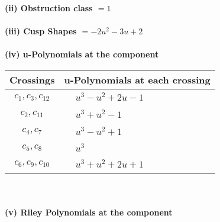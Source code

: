\documentclass[1p]{elsarticle_modified}
\theoremstyle{definition}
\begin{document}
\flushleft \textbf{(ii) Obstruction class $= 1$}\\~\\
\flushleft \textbf{(iii) Cusp Shapes $= -2 u^2-3 u+2$}\\~\\
\newpage\renewcommand{\arraystretch}{1}
\flushleft \textbf{(iv) u-Polynomials at the component}\newline \\
\begin{tabular}{m{50pt}|m{274pt}}
Crossings & \hspace{64pt}u-Polynomials at each crossing \\
\hline $$\begin{aligned}c_{1},c_{3},c_{12}\end{aligned}$$&$\begin{aligned}
&u^3- u^2+2 u-1
\end{aligned}$\\
\hline $$\begin{aligned}c_{2},c_{11}\end{aligned}$$&$\begin{aligned}
&u^3+u^2-1
\end{aligned}$\\
\hline $$\begin{aligned}c_{4},c_{7}\end{aligned}$$&$\begin{aligned}
&u^3- u^2+1
\end{aligned}$\\
\hline $$\begin{aligned}c_{5},c_{8}\end{aligned}$$&$\begin{aligned}
&u^3
\end{aligned}$\\
\hline $$\begin{aligned}c_{6},c_{9},c_{10}\end{aligned}$$&$\begin{aligned}
&u^3+u^2+2 u+1
\end{aligned}$\\
\hline
\end{tabular}\\~\\
\newpage\renewcommand{\arraystretch}{1}
\flushleft \textbf{(v) Riley Polynomials at the component}\newline \\
\end{document}
